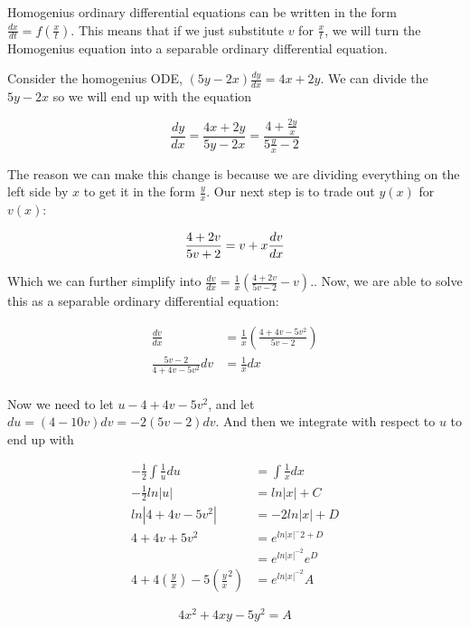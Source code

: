     Homogenius ordinary differential equations can be written in the form $\frac{dx}{dt}=f\left(\frac{x}{t}\right)$. This means that if we just substitute $v$ for $\frac{x}{t}$, we will turn the Homogenius equation into a separable ordinary differential equation.

    \begin{problem}
      Consider the homogenius ODE, $(5y-2x)\frac{dy}{dx}=4x+2y$. We can divide the $5y-2x$ so we will end up with the equation

      \begin{equation}
        \frac{dy}{dx}=\frac{4x+2y}{5y-2x}=\frac{4+\frac{2y}{x}}{5\frac{y}{x}-2}
      \end{equation}

      The reason we can make this change is because we are dividing everything on the left side by $x$ to get it in the form $\frac{y}{x}$. Our next step is to trade out $y(x)$ for $v(x)$:

      \begin{equation}
        \frac{4+2v}{5v+2}=v+x\frac{dv}{dx}\\
      \end{equation}

      Which we can further simplify into $\frac{dv}{dx}=\frac{1}{x}\left(\frac{4+2v}{5v-2}-v\right).$. Now, we are able to solve this as a separable ordinary differential equation:

      \begin{equation}
        \begin{aligned}
          \frac{dv}{dx}&=\frac{1}{x}\left(\frac{4+4v-5v^2}{5v-2}\right)\\
          \frac{5v-2}{4+4v-5v^2}dv&=\frac{1}{x}dx\\
        \end{aligned}
      \end{equation}

      Now we need to let $u-4+4v-5v^2$, and let $du=(4-10v)dv=-2(5v-2)dv$. And then we integrate with respect to $u$ to end up with 

      \begin{equation}
        \begin{aligned}
          -\frac{1}{2}\int\frac{1}{u}du&=\int\frac{1}{x}dx\\
          -\frac{1}{2}ln|u|&=ln|x|+C\\
          ln|4+4v-5v^2|&=-2ln|x|+D\\
          4+4v+5v^2&=e^{ln|x|^-2+D}\\
          &=e^{ln|x|^{-2}}e^D\\
          4+4\left(\frac{y}{x}\right)-5\left(\frac{y}{x}^2\right)&=e^{ln|x|^{-2}}A
        \end{aligned}
      \end{equation}

      \begin{equation}
        \boxed{4x^2+4xy-5y^2=A}
      \end{equation}
    \end{problem}

